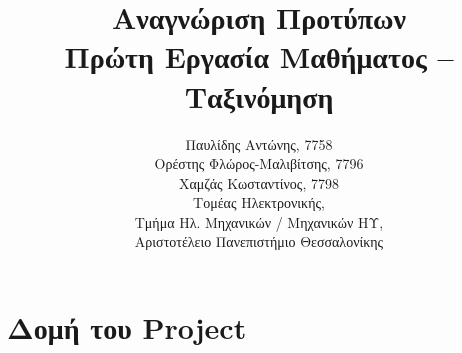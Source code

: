 
\usepackage{fontspec}
\setmainfont{DejaVu Serif}
\renewcommand{\contentsname}{Περιεχόμενα}
\renewcommand{\listfigurename}{Λίστα Σχημάτων}
\renewcommand{\figurename}{Σχήμα}
\renewcommand{\lstlistingname}{Καταχώρηση}
\renewcommand{\lstlistlistingname}{List of \lstlistingname s}

%

\title{Αναγνώριση Προτύπων\\
Πρώτη Εργασία Μαθήματος – Ταξινόμηση}
\author{
  Παυλίδης Αντώνης, 7758\\
  Ορέστης Φλώρος-Μαλιβίτσης, 7796\\
  Χαμζάς Κωσταντίνος, 7798\\
  Τομέας Ηλεκτρονικής,\\
  Τμήμα Ηλ. Μηχανικών / Μηχανικών ΗΥ,\\
  Αριστοτέλειο Πανεπιστήμιο Θεσσαλονίκης}

\maketitle
\tableofcontents
\listoffigures
\newpage

\chapter*{Δομή του Project} \label{project-structure}






